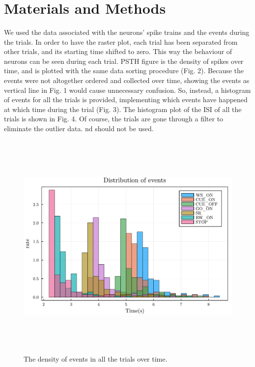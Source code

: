 \documentclass[9pt,twocolumn]{paper-template}
\begin{document}
\section*{Materials and Methods}
\paragraph*{} 
We used the data associated with the neurons' spike trains and the events during the trials. In order to have the raster plot, each trial has been separated from other trials, and its starting time shifted to zero. This way the behaviour of neurons can be seen during each trial. PSTH figure is the density of spikes over time, and is plotted with the same data sorting procedure (Fig. 2). Because the events were not altogether ordered and collected over time, showing the events as vertical line in Fig. 1 would cause unnecessary confusion. So, instead, a histogram of events for all the trials is provided, implementing which events have happened at which time during the trial (Fig. 3). The histogram plot of the ISI of all the trials is shown in Fig. 4. Of course, the trials are gone through a filter to eliminate the outlier data. 
nd should not be used. 

\begin{figure}
\centering
\includegraphics[width=12cm,height=11.4cm]{EvDist.pdf}
\caption{The density of events in all the trials over time.}\label{fig:side}
\end{figure}
\end{document}
